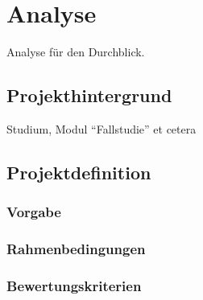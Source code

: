 \chapter{Analyse} 
	
	Analyse für den Durchblick.
	
	\section{Projekthintergrund}
	Studium, Modul \enquote{Fallstudie} et cetera
	
	\section{Projektdefinition}
		\subsection{Vorgabe}
		\subsection{Rahmenbedingungen}
		\subsection{Bewertungskriterien}